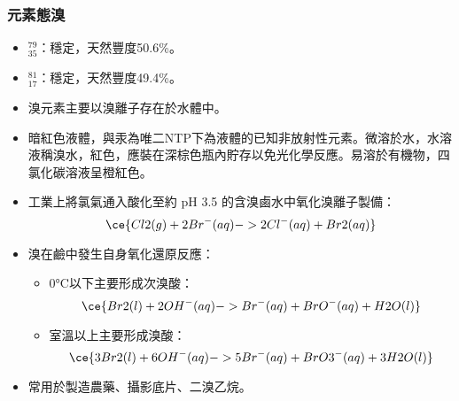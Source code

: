 \documentclass[a4paper,12pt]{report}
\begin{document}
\subsubsection{元素態溴}
\begin{itemize}
\item $^{79}_{35}$\rmBr：穩定，天然豐度50.6\%。
\item $^{81}_{17}$\rmBr：穩定，天然豐度49.4\%。
\item 溴元素主要以溴離子存在於水體中。
\item 暗紅色液體，與汞為唯二NTP下為液體的已知非放射性元素。微溶於水，水溶液稱溴水，紅色，應裝在深棕色瓶內貯存以免光化學反應。易溶於有機物，四氯化碳溶液呈橙紅色。
\item 工業上將氯氣通入酸化至約 pH 3.5 的含溴鹵水中氧化溴離子製備：
\[\ce{Cl2(g) + 2Br^-(aq) -> 2Cl^-(aq) + Br2(aq)}\]
\item 溴在鹼中發生自身氧化還原反應：
\begin{itemize}
\item 0°C以下主要形成次溴酸：
\[\ce{Br2(l) + 2OH^-(aq) -> Br^-(aq) + BrO^-(aq) + H2O(l)}\]
\item 室溫以上主要形成溴酸：
\[\ce{3Br2(l) + 6OH^-(aq) -> 5Br^-(aq) + BrO3^-(aq) + 3H2O(l)}\]
\end{itemize}
\item 常用於製造農藥、攝影底片、二溴乙烷。
\end{itemize}
\end{document}
